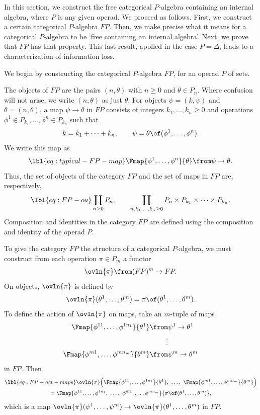 In this section, we construct the free categorical $P$-algebra containing
an internal algebra, where $P$ is any given operad.  We proceed as follows.
First, we construct a certain categorical $P$-algebra $FP$.  Then, we make
precise what it means for a categorical $P$-algebra to be `free containing
an internal algebra'.  Next, we prove that $FP$ has that property.  This
last result, applied in the case $P = \Delta$, leads to a characterization
of information loss.

We begin by constructing the categorical $P$-algebra $FP$, for
an operad $P$ of sets.

The objects of $FP$ are the pairs $(n, \theta)$ with $n \geq 0$ and $\theta
\in P_n$.  Where confusion will not arise, we write $(n, \theta)$ as just
$\theta$.  For objects $\psi = (k, \psi)$ and $\theta = (n, \theta)$, a map
$\psi \to \theta$ in $FP$ consists of integers $k_1, \ldots, k_n \geq 0$
and operations $\phi^1 \in P_{k_1}, \ldots, \phi^n \in P_{k_n}$ such that
\[
k = k_1 + \cdots + k_n, 
\qquad
\psi = \theta \of (\phi^1, \ldots, \phi^n).
\]
We write this map as
% 
\begin{equation}
\lbl{eq:typical-FP-map}
\Fmap{\phi^1, \ldots, \phi^n}{\theta} \from \psi \to \theta.
\end{equation}
% 
Thus, the set of objects of the category $FP$ and the set of maps in $FP$
are, respectively,
% 
\begin{equation}
\lbl{eq:FP-oa}
\coprod_{n \geq 0} P_n,
\qquad
\coprod_{n, k_1, \ldots, k_n \geq 0} 
P_n \times P_{k_1} \times \cdots \times P_{k_n}.
\end{equation}
% 
Composition and identities in the category $FP$ are defined using the
composition and identity of the operad $P$.

To give the category $FP$ the structure of a categorical $P$-algebra, we
must construct from each operation $\pi \in P_m$ a functor
\[
\ovln{\pi}\from (FP)^m \to FP.
\]
On objects, $\ovln{\pi}$ is defined by
\[
\ovln{\pi} (\theta^1, \ldots, \theta^m)
=
\pi \of (\theta^1, \ldots, \theta^m).
\]
To define the action of $\ovln{\pi}$ on maps, take an $m$-tuple of maps 
% 
\begin{align*}
\Fmap{\phi^{1 1}, \ldots, \phi^{1 n_1}}{\theta^1} \from       &
\psi^1 \to \theta^1    \\
\vdots  \\
\Fmap{\phi^{m 1}, \ldots, \phi^{m n_m}}{\theta^m} \from       &
\psi^m \to \theta^m
\end{align*}
% 
in $FP$.  Then
% 
\begin{multline}
\lbl{eq:FP-act-maps} 
\ovln{\pi}\Bigl(
\Fmap{\phi^{1 1}, \ldots, \phi^{1 n_1}}{\theta^1},
\ \ldots, \ 
\Fmap{\phi^{m 1}, \ldots, \phi^{m n_m}}{\theta^m}
\Bigr)  \\
=
\Fmap{\phi^{1 1}, \ldots, \phi^{1 n_1},
\ \ldots, \
\phi^{m 1}, \ldots, \phi^{m n_m}}%
{\pi\of(\theta^1, \ldots, \theta^m)},
\end{multline}
% 
which is a map $\ovln{\pi}(\psi^1, \ldots, \psi^m) \to
\ovln{\pi}(\theta^1, \ldots, \theta^m)$ in $FP$. 

